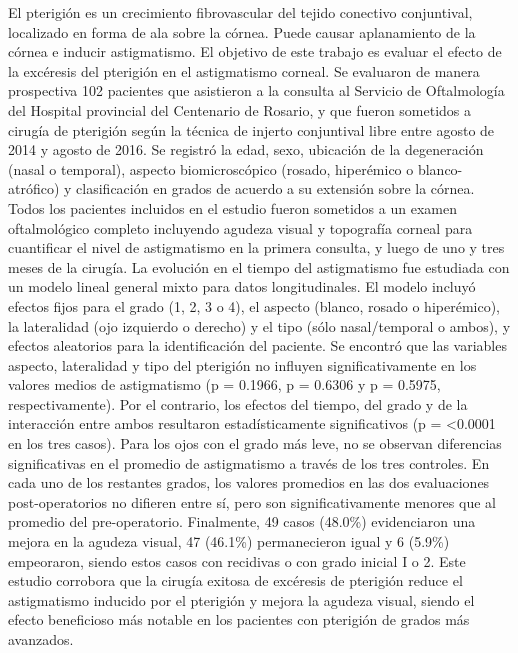 {El pterigión es un crecimiento fibrovascular del tejido conectivo conjuntival, localizado en forma de ala sobre la córnea. Puede causar aplanamiento de la córnea e inducir astigmatismo. El objetivo de este trabajo es evaluar el efecto de la excéresis del pterigión en el astigmatismo corneal. Se evaluaron de manera prospectiva 102 pacientes que asistieron a la consulta al Servicio de Oftalmología del Hospital provincial del Centenario de Rosario, y que fueron sometidos a cirugía de pterigión según la técnica de injerto conjuntival libre entre agosto de 2014 y agosto de 2016. Se registró la edad, sexo, ubicación de la degeneración (nasal o temporal), aspecto biomicroscópico (rosado, hiperémico o blanco-atrófico) y clasificación en grados de acuerdo a su extensión sobre la córnea. Todos los pacientes incluidos en el estudio fueron sometidos a un examen oftalmológico completo incluyendo agudeza visual y topografía corneal para cuantificar el nivel de astigmatismo en la primera consulta, y luego de uno y tres meses de la cirugía. La evolución en el tiempo del astigmatismo fue estudiada con un modelo lineal general mixto para datos longitudinales. El modelo incluyó efectos fijos para el grado (1, 2, 3 o 4), el aspecto (blanco, rosado o hiperémico), la lateralidad (ojo izquierdo o derecho) y el tipo (sólo nasal/temporal o ambos), y efectos aleatorios para la identificación del paciente. Se encontró que las variables aspecto, lateralidad y tipo del pterigión no influyen significativamente en los valores medios de astigmatismo (p = 0.1966, p = 0.6306 y p = 0.5975, respectivamente). Por el contrario, los efectos del tiempo, del grado y de la interacción entre ambos resultaron estadísticamente significativos (p = <0.0001 en los tres casos). Para los ojos con el grado más leve, no se observan diferencias significativas en el promedio de astigmatismo a través de los tres controles. En cada uno de los restantes grados, los valores promedios en las dos evaluaciones post-operatorios no difieren entre sí, pero son significativamente menores que al promedio del pre-operatorio. Finalmente, 49 casos (48.0\%) evidenciaron una mejora en la agudeza visual, 47 (46.1\%) permanecieron igual y 6 (5.9\%) empeoraron, siendo estos casos con recidivas o con grado inicial I o 2. Este estudio corrobora que la cirugía exitosa de excéresis de pterigión reduce el astigmatismo inducido por el pterigión y mejora la agudeza visual, siendo el efecto beneficioso más notable en los pacientes con pterigión de grados más avanzados.}
